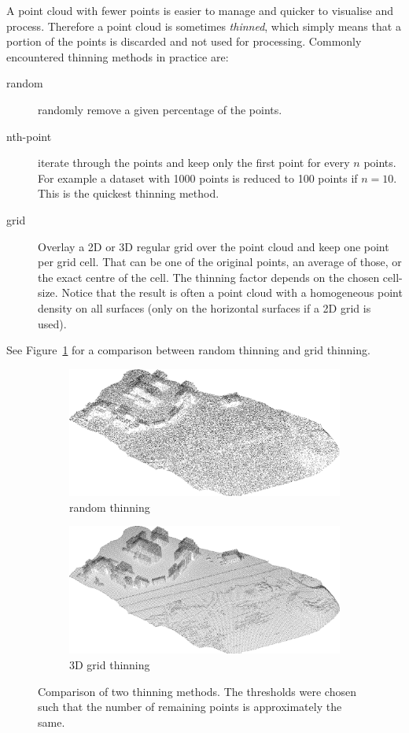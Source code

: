 A point cloud with fewer points is easier to manage and quicker to visualise and process.
Therefore a point cloud is sometimes \emph{thinned}, which simply means that a portion of the points is discarded and not used for processing.
Commonly encountered thinning methods in practice are:
\begin{description}
  \item[random] randomly remove a given percentage of the points.
  \item[nth-point] iterate through the points and keep only the first point for every $n$ points. For example a dataset with 1000 points is reduced to 100 points if $n=10$. This is the quickest thinning method.
  \item[grid] Overlay a 2D or 3D regular grid over the point cloud and keep one point per grid cell. That can be one of the original points, an average of those, or the exact centre of the cell. The thinning factor depends on the chosen cell-size. Notice that the result is often a point cloud with a homogeneous point density on all surfaces (only on the horizontal surfaces if a 2D grid is used).
\end{description}
See Figure~\ref{fig:randvsgrid} for a comparison between random thinning and grid thinning.
\begin{figure}
  \centering
  \begin{subfigure}[b]{0.95\linewidth}
    \centering
    \includegraphics[width=\textwidth]{figs/rand01.png}
    \caption{random thinning}
  \end{subfigure}

  \begin{subfigure}[b]{0.95\linewidth}
    \centering
    \includegraphics[width=\textwidth]{figs/voxel08m.png}
    \caption{3D grid thinning}
  \end{subfigure}
\caption{Comparison of two thinning methods. The thresholds were chosen such that the number of remaining points is approximately the same.}%
\label{fig:randvsgrid}
\end{figure}

